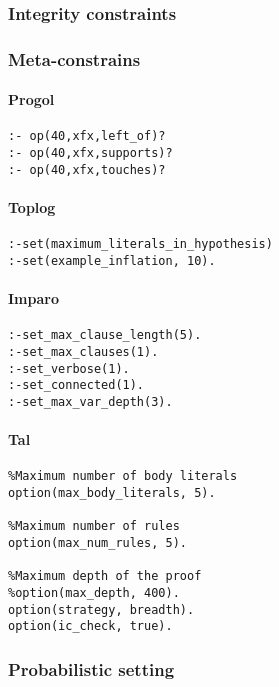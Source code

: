 \subsubsection{Integrity constraints}

\subsubsection{Meta-constrains}

\paragraph{Progol}
\begin{lstlisting}
:- op(40,xfx,left_of)?
:- op(40,xfx,supports)?
:- op(40,xfx,touches)?
\end{lstlisting}

\paragraph{Toplog}
\begin{lstlisting}
:-set(maximum_literals_in_hypothesis)
:-set(example_inflation, 10).
\end{lstlisting}

\paragraph{Imparo}
\begin{lstlisting}
:-set_max_clause_length(5).
:-set_max_clauses(1).
:-set_verbose(1).
:-set_connected(1).
:-set_max_var_depth(3).
\end{lstlisting}

\paragraph{Tal}
\begin{lstlisting}
%Maximum number of body literals
option(max_body_literals, 5).

%Maximum number of rules
option(max_num_rules, 5).

%Maximum depth of the proof
%option(max_depth, 400).
option(strategy, breadth).
option(ic_check, true).
\end{lstlisting}

\subsubsection{Probabilistic setting}

